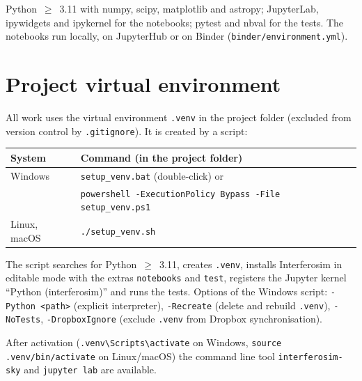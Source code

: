 
Python~$\geq$~3.11 with numpy, scipy, matplotlib and astropy; JupyterLab,
ipywidgets and ipykernel for the notebooks; pytest and nbval for the
tests. The notebooks run locally, on JupyterHub or on Binder
(\texttt{binder/environment.yml}).

\section{Project virtual environment}

All work uses the virtual environment \texttt{.venv} in the project
folder (excluded from version control by \texttt{.gitignore}). It is
created by a script:

\begin{center}
\begin{tabularx}{\linewidth}{@{}lL@{}}
\toprule
System & Command (in the project folder) \\
\midrule
Windows & \texttt{setup\_venv.bat} (double-click) or\\
        & \texttt{powershell -ExecutionPolicy Bypass -File setup\_venv.ps1} \\
Linux, macOS & \texttt{./setup\_venv.sh} \\
\bottomrule
\end{tabularx}
\end{center}

The script searches for Python~$\geq$~3.11, creates \texttt{.venv}, installs
Interferosim in editable mode with the extras \texttt{notebooks} and
\texttt{test}, registers the Jupyter kernel \enquote{Python
(interferosim)} and runs the tests. Options of the Windows script:
\texttt{-Python <path>} (explicit interpreter), \texttt{-Recreate}
(delete and rebuild \texttt{.venv}), \texttt{-NoTests},
\texttt{-DropboxIgnore} (exclude \texttt{.venv} from Dropbox
synchronisation).

After activation (\texttt{.venv\textbackslash Scripts\textbackslash activate}
on Windows, \texttt{source .venv/bin/activate} on Linux/macOS) the command
line tool \texttt{interferosim-sky} and \texttt{jupyter lab} are available.
